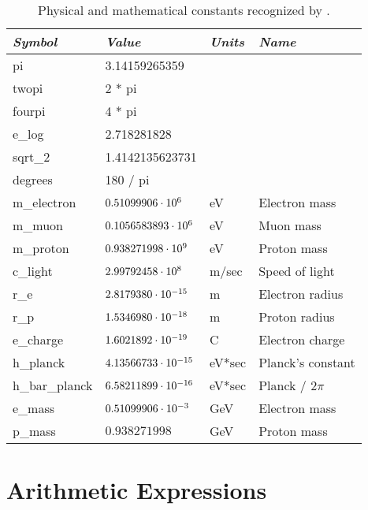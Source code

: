 {\begin{table}
\centering
\begin{tabular}{|l|l|l|l|} \hline
  {\em Symbol}  & {\em Value}       & {\em Units} &  {\em Name}       \\ \hline
  pi            & 3.14159265359          &        &                   \\
  twopi         & 2 * pi                 &        &                   \\
  fourpi        & 4 * pi                 &        &                   \\
  e_log         & 2.718281828            &        &                   \\
  sqrt_2        & 1.4142135623731        &        &                   \\
  degrees       & 180 / pi               &        &                   \\
  m_electron    & $0.51099906 \cdot 10^{6}$   & eV     & Electron mass     \\
  m_muon        & $0.1056583893 \cdot 10^{6}$ & eV     & Muon mass         \\
  m_proton      & $0.938271998 \cdot 10^{9}$  & eV     & Proton mass       \\
  c_light       & $2.99792458 \cdot 10^{8}$   & m/sec  & Speed of light    \\
  r_e           & $2.8179380 \cdot 10^{-15}$  & m      & Electron radius   \\
  r_p           & $1.5346980 \cdot 10^{-18}$  & m      & Proton radius     \\
  e_charge      & $1.6021892 \cdot 10^{-19}$  & C      & Electron charge   \\
  h_planck      & $4.13566733 \cdot 10^{-15}$ & eV*sec & Planck's constant \\
  h_bar_planck  & $6.58211899 \cdot 10^{-16}$ & eV*sec & Planck / $2\pi$   \\
  e_mass        & $0.51099906 \cdot 10^{-3}$  & GeV    & Electron mass     \\
  p_mass        & $0.938271998$          & GeV    & Proton mass       \\ \hline
\end{tabular}
\caption{Physical and mathematical constants recognized by \bmad.}
\label{t:constants}
\end{table}

\section{Arithmetic Expressions}

}
